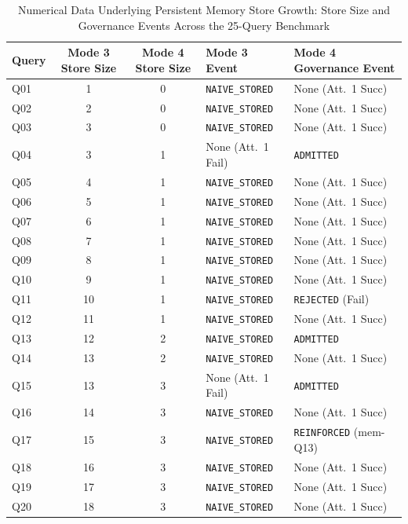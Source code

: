 \begin{table}[t]
\centering
\caption{Numerical Data Underlying Persistent Memory Store Growth: Store Size and Governance Events Across the 25-Query Benchmark}
\label{tab:fig6_validation}
\footnotesize
\setlength{\tabcolsep}{12pt}
\renewcommand{\arraystretch}{1.03}
\begin{tabular}{l c c l l}
\toprule
\textbf{Query} & \textbf{Mode 3 Store Size} & \textbf{Mode 4 Store Size} & \textbf{Mode 3 Event} & \textbf{Mode 4 Governance Event} \\
\midrule
Q01 & 1 & 0 & \texttt{NAIVE\_STORED} & None (Att.~1 Succ) \\
Q02 & 2 & 0 & \texttt{NAIVE\_STORED} & None (Att.~1 Succ) \\
Q03 & 3 & 0 & \texttt{NAIVE\_STORED} & None (Att.~1 Succ) \\
Q04 & 3 & 1 & None (Att.~1 Fail) & \texttt{ADMITTED} \\
Q05 & 4 & 1 & \texttt{NAIVE\_STORED} & None (Att.~1 Succ) \\
Q06 & 5 & 1 & \texttt{NAIVE\_STORED} & None (Att.~1 Succ) \\
Q07 & 6 & 1 & \texttt{NAIVE\_STORED} & None (Att.~1 Succ) \\
Q08 & 7 & 1 & \texttt{NAIVE\_STORED} & None (Att.~1 Succ) \\
Q09 & 8 & 1 & \texttt{NAIVE\_STORED} & None (Att.~1 Succ) \\
Q10 & 9 & 1 & \texttt{NAIVE\_STORED} & None (Att.~1 Succ) \\
Q11 & 10 & 1 & \texttt{NAIVE\_STORED} & \texttt{REJECTED} (Fail) \\
Q12 & 11 & 1 & \texttt{NAIVE\_STORED} & None (Att.~1 Succ) \\
Q13 & 12 & 2 & \texttt{NAIVE\_STORED} & \texttt{ADMITTED} \\
Q14 & 13 & 2 & \texttt{NAIVE\_STORED} & None (Att.~1 Succ) \\
Q15 & 13 & 3 & None (Att.~1 Fail) & \texttt{ADMITTED} \\
Q16 & 14 & 3 & \texttt{NAIVE\_STORED} & None (Att.~1 Succ) \\
Q17 & 15 & 3 & \texttt{NAIVE\_STORED} & \texttt{REINFORCED} (mem-Q13) \\
Q18 & 16 & 3 & \texttt{NAIVE\_STORED} & None (Att.~1 Succ) \\
Q19 & 17 & 3 & \texttt{NAIVE\_STORED} & None (Att.~1 Succ) \\
Q20 & 18 & 3 & \texttt{NAIVE\_STORED} & None (Att.~1 Succ) \\

\end{tabular}
\end{table}
